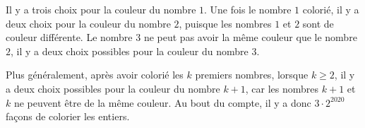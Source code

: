 Il y a trois choix pour la couleur du nombre $1$. Une fois le nombre $1$ colorié, il y a deux choix pour la couleur du nombre $2$, puisque les nombres $1$ et $2$ sont de couleur différente. Le nombre $3$ ne peut pas avoir la même couleur que le nombre $2$, il y a deux choix possibles pour la couleur du nombre $3$.

Plus généralement, après avoir colorié les $k$ premiers nombres, lorsque $k\ge 2$, il y a deux choix possibles pour
la couleur du nombre $k+1$, car les nombres $k+1$ et $k$ ne peuvent être de la même couleur.
Au bout du compte, il y a donc $3 \cdot 2^{2020}$ façons de colorier les entiers.